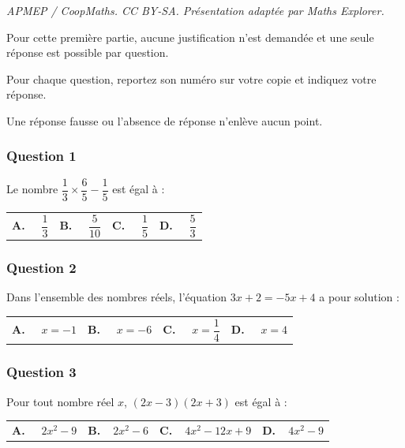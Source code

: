 \documentclass[10pt]{article}
\begin{document}
\noindent\textit{APMEP / CoopMaths. CC BY-SA. Présentation adaptée par Maths Explorer.}\par\medskip
Pour cette première partie, aucune justification n'est demandée et une seule réponse est possible par question.

Pour chaque question, reportez son numéro sur votre copie et indiquez votre réponse.

Une réponse fausse ou l'absence de réponse n'enlève aucun point.

\subsubsection*{Question 1}
Le nombre $\dfrac{1}{3} \times \dfrac{6}{5}-\dfrac{1}{5}$ est égal à :

\begin{center}
\begin{tabularx}{\linewidth}{*{4}{X}}
\textbf{A.~~} $\dfrac13$ &\textbf{B.~~} $\dfrac{5}{10}$ &\textbf{C.~~} $\dfrac15$ &\textbf{D.~~} $\dfrac53$\\
\end{tabularx}
\end{center}

\subsubsection*{Question 2}

Dans l'ensemble des nombres réels, l'équation $3 x+2= -5 x+4$ a pour solution :

\begin{center}
\begin{tabularx}{\linewidth}{*{4}{X}}
\textbf{A.~~} $x = - 1$ &\textbf{B.~~} $x = - 6$ &\textbf{C.~~} $x= \dfrac14$ &\textbf{D.~~} $x = 4$\\
\end{tabularx}
\end{center}

\subsubsection*{Question 3}
Pour tout nombre réel $x$, \quad$(2x -3)(2x + 3)$ \quad est égal à :

\begin{center}
\begin{tabularx}{\linewidth}{*{4}{X}}
\textbf{A.~~} $2x^2 - 9$&\textbf{B.~~}$2x^2-6$&\textbf{C.~~}$4x^2- 12x + 9$&
\textbf{D.~~}$4x^2 - 9$\\
\end{tabularx}
\end{center}
\end{document}
